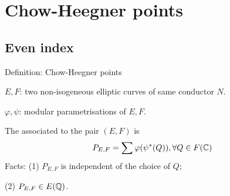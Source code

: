 \documentclass[handout]{beamer}
\newcommand{\fc}{\mathfrak{c}}
\begin{document}
\iffalse
\begin{frame}{Further work}
\begin{itemize}
\item relation to automorphic side: \\ psuedo-eigenvalues relates to epsilon factors of $\pi_{f \otimes \chi}$. \\
Another way to determine the local components of $\pi_f$. 
 
\item Let $\fc$ be a cusp of prime denominator $p \geq 5$. Seems that $a_1(f_\fc)$ is only divisible by primes that are $\pm 1 \mod{p}$. \\
 Can we prove this? 
 \end{itemize}
\end{frame}
\fi


\section{Chow-Heegner points}


 \begin{frame}
 \frametitle{\insertsection}
 \tableofcontents[currentsection]
 \end{frame}
 
\subsection{Even index}

\begin{frame}[fragile]{Definition: Chow-Heegner points}
\begin{center}
\end{center}
$E,F$: two non-isogeneous elliptic curves of  same conductor $N$. 

$\varphi, \psi$: modular parametrisations of $E,F$. 

The  associated to the pair $(E,F)$ is 
\[
	P_{E,F} = \sum \varphi(\psi^{*}(Q)), \forall Q \in F(\mathbb{C}) 
\]
Facts: (1) $P_{E,F}$ is independent of the choice of $Q$;  

\qquad \quad (2) $P_{E,F} \in E(\mathbb{Q})$. 

\end{frame}
\end{document}
